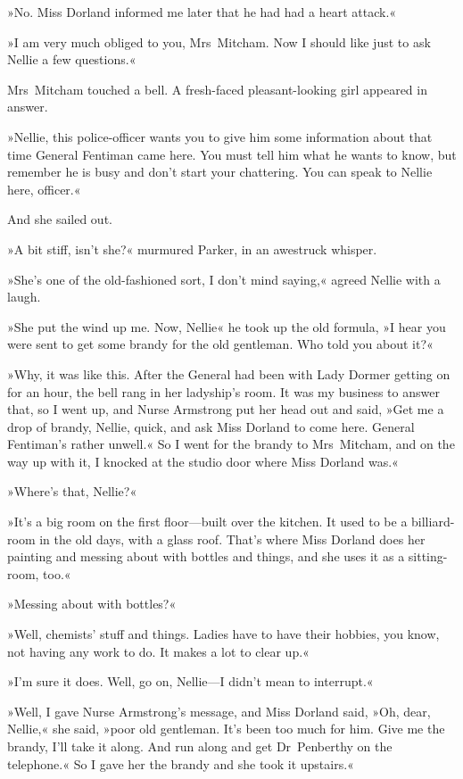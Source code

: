 »No. Miss Dorland informed me later that he had had a heart attack.«

»I am very much obliged to you, Mrs~Mitcham. Now I should like just to ask Nellie a few questions.«

Mrs~Mitcham touched a bell. A fresh-faced pleasant-looking girl appeared in answer.

»Nellie, this police-officer wants you to give him some information about that time General Fentiman came here. You must tell him what he wants to know, but remember he is busy and don't start your chattering. You can speak to Nellie here, officer.«

And she sailed out.

»A bit stiff, isn't she?« murmured Parker, in an awestruck whisper.

»She's one of the old-fashioned sort, I don't mind saying,« agreed Nellie with a laugh.

»She put the wind up me. Now, Nellie\longdash« he took up the old formula, »I hear you were sent to get some brandy for the old gentleman. Who told you about it?«

»Why, it was like this. After the General had been with Lady Dormer getting on for an hour, the bell rang in her ladyship's room. It was my business to answer that, so I went up, and Nurse Armstrong put her head out and said, »Get me a drop of brandy, Nellie, quick, and ask Miss Dorland to come here. General Fentiman's rather unwell.« So I went for the brandy to Mrs~Mitcham, and on the way up with it, I knocked at the studio door where Miss Dorland was.«

»Where's that, Nellie?«

»It's a big room on the first floor—built over the kitchen. It used to be a billiard-room in the old days, with a glass roof. That's where Miss Dorland does her painting and messing about with bottles and things, and she uses it as a sitting-room, too.«

»Messing about with bottles?«

»Well, chemists' stuff and things. Ladies have to have their hobbies, you know, not having any work to do. It makes a lot to clear up.«

»I'm sure it does. Well, go on, Nellie—I didn't mean to interrupt.«

»Well, I gave Nurse Armstrong's message, and Miss Dorland said, »Oh, dear, Nellie,« she said, »poor old gentleman. It's been too much for him. Give me the brandy, I'll take it along. And run along and get Dr~Penberthy on the telephone.« So I gave her the brandy and she took it upstairs.«

